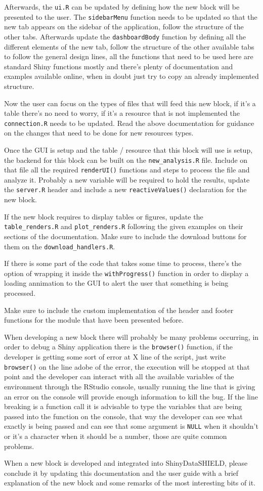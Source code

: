 \documentclass[
]{book}
\begin{document}
Afterwards, the \texttt{ui.R} can be updated by defining how the new block will be presented to the user. The \texttt{sidebarMenu} function needs to be updated so that the new tab appears on the sidebar of the application, follow the structure of the other tabs. Afterwards update the \texttt{dashboardBody} function by defining all the different elements of the new tab, follow the structure of the other available tabs to follow the general design lines, all the functions that need to be used here are standard Shiny functions mostly and there's plenty of documentation and examples available online, when in doubt just try to copy an already implemented structure.

Now the user can focus on the types of files that will feed this new block, if it's a table there's no need to worry, if it's a resource that is not implemented the \texttt{connection.R} needs to be updated. Read the above documentation for guidance on the changes that need to be done for new resources types.

Once the GUI is setup and the table / resource that this block will use is setup, the backend for this block can be built on the \texttt{new\_analysis.R} file. Include on that file all the required \texttt{renderUI()} functions and steps to process the file and analyze it. Probably a new variable will be required to hold the results, update the \texttt{server.R} header and include a new \texttt{reactiveValues()} declaration for the new block.

If the new block requires to display tables or figures, update the \texttt{table\_renders.R} and \texttt{plot\_renders.R} following the given examples on their sections of the documentation. Make sure to include the download buttons for them on the \texttt{download\_handlers.R}.

If there is some part of the code that takes some time to process, there's the option of wrapping it inside the \texttt{withProgress()} function in order to display a loading annimation to the GUI to alert the user that something is being processed.

Make sure to include the custom implementation of the header and footer functions for the module that have been presented before.

When developing a new block there will probably be many problems occurring, in order to debug a Shiny application there is the \texttt{browser()} function, if the developer is getting some sort of error at X line of the script, just write \texttt{browser()} on the line adobe of the error, the execution will be stopped at that point and the developer can interact with all the available variables of the environment through the RStudio console, usually running the line that is giving an error on the console will provide enough information to kill the bug. If the line breaking is a function call it is advisable to type the variables that are being passed into the function on the console, that way the developer can see what exactly is being passed and can see that some argument is \texttt{NULL} when it shouldn't or it's a character when it should be a number, those are quite common problems.

When a new block is developed and integrated into ShinyDataSHIELD, please conclude it by updating this documentation and the user guide with a brief explanation of the new block and some remarks of the most interesting bits of it.

  
\end{document}
